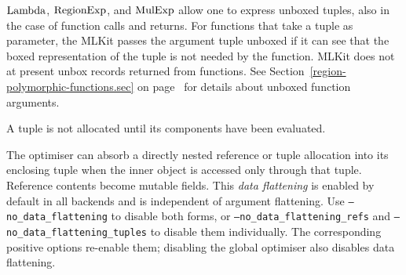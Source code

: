 \documentclass[12pt]{book}
\begin{document}
$\hbox{\rm Lambda}$, $\hbox{\rm RegionExp}$, and $\hbox{\rm MulExp}$ allow one to express unboxed tuples, also in
the case of function calls and returns. For functions that take a tuple as
parameter, the MLKit passes the argument tuple unboxed
%
%
%
%
%
%
if it can see that the boxed representation of the tuple is not needed by the
function. MLKit does not at present unbox records returned from
functions. See Section~\ref{region-polymorphic-functions.sec} on
page~\pageref{region-polymorphic-functions.sec} for details about unboxed
function arguments.

A tuple is not allocated until its components have been evaluated.

The optimiser can absorb a directly nested reference or tuple allocation into
its enclosing tuple when the inner object is accessed only through that tuple.
Reference contents become mutable fields. This \emph{data flattening} is enabled
by default in all backends and is independent of argument flattening. Use
\texttt{--no\_data\_flattening} to disable both forms, or
\texttt{--no\_data\_flattening\_refs} and
\texttt{--no\_data\_flattening\_tuples} to disable them individually.
The corresponding positive options re-enable them; disabling the global
optimiser also disables data flattening.
\end{document}
